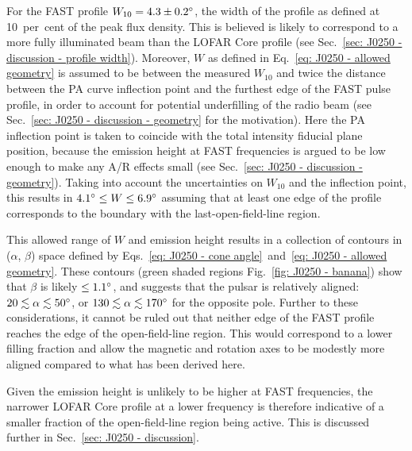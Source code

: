 For the FAST profile $W_{10}=4.3\pm0.2^\circ$, the width of the profile as defined at 10~per~cent of the peak flux density. This is believed is likely to correspond to a more fully illuminated beam than the LOFAR Core profile (see Sec.~\ref{sec: J0250 - discussion - profile width}). Moreover, $W$ as defined in Eq.~\eqref{eq: J0250 - allowed geometry} is assumed to be between the measured $W_{10}$ and twice the distance between the PA curve inflection point and the furthest edge of the FAST pulse profile, in order to account for potential underfilling of the radio beam (see Sec.~\ref{sec: J0250 - discussion - geometry} for the motivation). Here the PA inflection point is taken to coincide with the total intensity fiducial plane position, because the emission height at FAST frequencies is argued to be low enough to make any A/R effects small (see Sec.~\ref{sec: J0250 - discussion - geometry}). Taking into account the uncertainties on $W_{10}$ and the inflection point, this results in $4.1^\circ \leq W \leq 6.9^\circ$ assuming that at least one edge of the profile corresponds to the boundary with the last-open-field-line region.

This allowed range of $W$ and emission height results in a collection of contours in ($\alpha$, $\beta$) space defined by Eqs.~\eqref{eq: J0250 - cone angle}~and~\eqref{eq: J0250 - allowed geometry}. These contours (green shaded regions Fig.~\ref{fig: J0250 - banana}) show that $\beta$ is likely $\leq1.1^\circ$, and suggests that the pulsar is relatively aligned: $20 \lesssim \alpha \lesssim 50^\circ$, or $130 \lesssim \alpha \lesssim 170^\circ$ for the opposite pole. Further to these considerations, it cannot be ruled out that neither edge of the FAST profile reaches the edge of the open-field-line region. This would correspond to a lower filling fraction and allow the magnetic and rotation axes to be modestly more aligned compared to what has been derived here. 

Given the emission height is unlikely to be higher at FAST frequencies, the narrower LOFAR Core profile at a lower frequency is therefore indicative of a smaller fraction of the open-field-line region being active. This is discussed further in Sec.~\ref{sec: J0250 - discussion}.
























